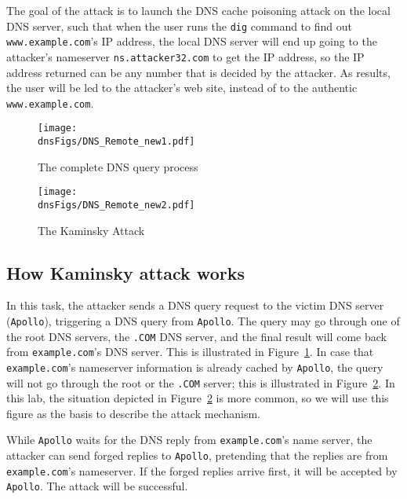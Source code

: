 The goal of the attack is to launch the DNS cache poisoning attack
on the local DNS server, such that 
when the user runs the {\tt dig} command to find out {\tt
www.example.com}'s IP address, the local DNS server will end
up going to the attacker's nameserver {\tt ns.attacker32.com} 
to get the IP address, so the IP address returned can be 
any number that is decided by the attacker. As results, the 
user will be led to the attacker's web site,
instead of to the authentic {\tt www.example.com}.




\begin{figure}[htb]
\centering
\texttt{[image: \\dnsFigs/DNS\_Remote\_new1.pdf]}
\caption{The complete DNS query process} 
\label{fig:flow_diagram1}
\end{figure}


\begin{figure}[htb]
\centering
\texttt{[image: \\dnsFigs/DNS\_Remote\_new2.pdf]}
\caption{The Kaminsky Attack}
\label{fig:flow_diagram2}
\end{figure}



\subsection{How Kaminsky attack works}

In this task, the attacker sends a DNS query request to the victim
DNS server ({\tt Apollo}), triggering a DNS query from {\tt Apollo}. The
query may go through one of the root DNS servers, the {\tt .COM} DNS server, and 
the final result will come back from {\tt example.com}'s DNS server. This 
is illustrated in Figure~\ref{fig:flow_diagram1}. In case that 
{\tt example.com}'s nameserver information is already cached by 
{\tt Apollo}, the query will not go through the root or the 
{\tt .COM} server; this is illustrated in Figure~\ref{fig:flow_diagram2}.
In this lab, the situation depicted in  Figure~\ref{fig:flow_diagram2} is 
more common, so we will use this figure as the basis to describe 
the attack mechanism.

While {\tt Apollo} waits for the DNS reply from {\tt example.com}'s name
server, the attacker can send forged replies to {\tt Apollo}, pretending 
that the replies are from {\tt example.com}'s nameserver. If the forged 
replies arrive first, it will be accepted by {\tt Apollo}. The attack will
be successful.



